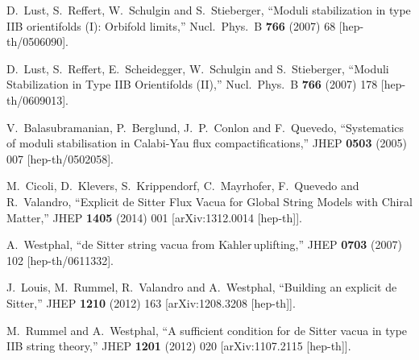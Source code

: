\documentclass[11pt,a4paper]{article}
\newcommand{\Kahler}{\ensuremath{\text{K}\ddot{\text{a}}\text{hler}\,}}
\begin{document}
\begin{thebibliography}{99}
  D.~Lust, S.~Reffert, W.~Schulgin and S.~Stieberger,
  ``Moduli stabilization in type IIB orientifolds (I): Orbifold limits,''
  Nucl.\ Phys.\ B {\bf 766} (2007) 68
  [hep-th/0506090].


  D.~Lust, S.~Reffert, E.~Scheidegger, W.~Schulgin and S.~Stieberger,
  ``Moduli Stabilization in Type IIB Orientifolds (II),''
  Nucl.\ Phys.\ B {\bf 766} (2007) 178
  [hep-th/0609013].


  V.~Balasubramanian, P.~Berglund, J.~P.~Conlon and F.~Quevedo,
  ``Systematics of moduli stabilisation in Calabi-Yau flux compactifications,''
  JHEP {\bf 0503} (2005) 007
  [hep-th/0502058].


  M.~Cicoli, D.~Klevers, S.~Krippendorf, C.~Mayrhofer, F.~Quevedo and R.~Valandro,
  ``Explicit de Sitter Flux Vacua for Global String Models with Chiral Matter,''
  JHEP {\bf 1405} (2014) 001
  [arXiv:1312.0014 [hep-th]].


  A.~Westphal,
  ``de Sitter string vacua from \Kahler uplifting,''
  JHEP {\bf 0703} (2007) 102
  [hep-th/0611332].


  J.~Louis, M.~Rummel, R.~Valandro and A.~Westphal,
  ``Building an explicit de Sitter,''
  JHEP {\bf 1210} (2012) 163
  [arXiv:1208.3208 [hep-th]].


  M.~Rummel and A.~Westphal,
  ``A sufficient condition for de Sitter vacua in type IIB string theory,''
  JHEP {\bf 1201} (2012) 020
  [arXiv:1107.2115 [hep-th]].



\end{thebibliography}
\end{document}
